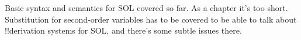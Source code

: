 \documentclass[../../../include/open-logic-chapter]{subfiles}
\begin{document}

\begin{editorial}
Basic syntax and semantics for SOL covered so far. As a chapter it's
too short. Substitution for second-order variables has to be covered
to be able to talk about !!{derivation} systems for SOL, and there's some
subtle issues there.
\end{editorial}







\OLEndChapterHook
\end{document}
